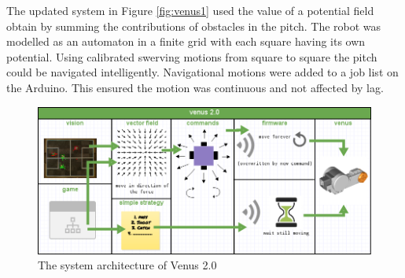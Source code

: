 \documentclass[a4paper,12pt]{article}
\begin{document}
The updated system in Figure \ref{fig:venus1} used the value of a potential field obtain by summing the contributions of obstacles in the pitch. The robot was modelled as an automaton in a finite grid with each square having its own potential. Using calibrated swerving motions from square to square the pitch could be navigated intelligently. Navigational motions were added to a job list on the Arduino. This ensured the motion was continuous and not affected by lag.

\begin{figure}
  \begin{center}
\includegraphics[scale=0.4]{arch3.png}
\end{center}
	\caption{The system architecture of Venus 2.0}
	\vspace{20pt}
	\label{fig:venus2}
\end{figure}

\restoregeometry
\end{document}

